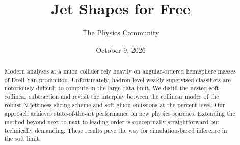 \documentclass[11pt]{article}
\title{Jet Shapes for Free}
\author{The Physics Community}
\date{October 9, 2026}
\numberwithin{equation}{section}
\theoremstyle{definition}
\theoremstyle{remark}
\begin{document}
\maketitle
\begin{abstract}
Modern analyses at a muon collider rely heavily on angular-ordered
hemisphere masses of Drell-Yan production. Unfortunately, hadron-level
weakly supervised classifiers are notoriously difficult to compute in
the large-data limit. We distill the nested soft-collinear subtraction
and revisit the interplay between the collinear modes of the robust
N-jettiness slicing scheme and soft gluon emissions at the percent
level. Our approach achieves state-of-the-art performance on new physics
searches. Extending the method beyond next-to-next-to-leading order is
conceptually straightforward but technically demanding. These results
pave the way for simulation-based inference in the soft limit.
\end{abstract}
\tableofcontents





\nocite{*}


\end{document}
